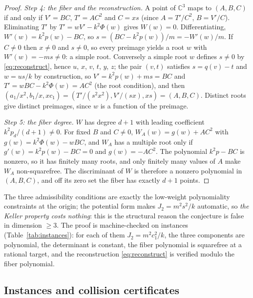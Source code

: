 \documentclass[11pt]{article}
\theoremstyle{definition}
\theoremstyle{remark}
\newcommand{\C}{\mathbb{C}}
\begin{document}
\begin{proof}
\emph{Step 4: the fiber and the reconstruction.} A point of $\C^3$ maps to $(A,B,C)$ if and only if $V' = BC$, $T' = AC^2$ and $C = xs$ (since $A = T'/C^2$, $B = V'/C$). Eliminating $T'$ by $T' = wV' - k^2\Phi(w)$ gives $W(w) = 0$. Differentiating, $W'(w) = k^2p(w) - BC$, so $s = (BC - k^2p(w))/m = -W'(w)/m$. If $C \neq 0$ then $x \neq 0$ and $s \neq 0$, so every preimage yields a root $w$ with $W'(w) = -ms \neq 0$: a simple root. Conversely a simple root $w$ defines $s \ne 0$ by \eqref{eq:reconstruct}, hence $u$, $x$, $v$, $t$, $y$, $z$; the pair $(v,t)$ satisfies $s = q(v) - t$ and $w = us/k$ by construction, so $V' = k^2p(w) + ms = BC$ and $T' = wBC - k^2\Phi(w) = AC^2$ (the root condition), and then $(a_1/x^2, b_1/x, xc_1) = (T'/(s^2x^2), V'/(sx), xs) = (A,B,C)$. Distinct roots give distinct preimages, since $w$ is a function of the preimage.

\emph{Step 5: the fiber degree.} $W$ has degree $d+1$ with leading coefficient $k^2p_d/(d+1) \neq 0$. For fixed $B$ and $C \neq 0$, $W_A(w) = g(w) + AC^2$ with $g(w) = k^2\Phi(w) - wBC$, and $W_A$ has a multiple root only if $g'(w) = k^2p(w) - BC = 0$ and $g(w) = -AC^2$. The polynomial $k^2 p - BC$ is nonzero, so it has finitely many roots, and only finitely many values of $A$ make $W_A$ non-squarefree. The discriminant of $W$ is therefore a nonzero polynomial in $(A,B,C)$, and off its zero set the fiber has exactly $d+1$ points.
\end{proof}

The three admissibility conditions are exactly the low-weight polynomiality constraints at the origin; the potential form makes $J_2 = m^2 s^2/k$ automatic, so \emph{the Keller property costs nothing}: this is the structural reason the conjecture is false in dimension $\ge 3$. The proof is machine-checked on instances (Table~\ref{tab:instances}): for each of them $J_2 = m^2c_1^2/k$, the three components are polynomial, the determinant is constant, the fiber polynomial is squarefree at a rational target, and the reconstruction \eqref{eq:reconstruct} is verified modulo the fiber polynomial.

\subsection{Instances and collision certificates}\label{sec:instances}

\begin{table}[t]\centering\small\setlength{\tabcolsep}{4pt}

\caption{Instances of the constructor, read from the stored outputs of computations EXP-004 and EXP-008: the seed $p$ of degree $d$, the scale $k$, the section tail beyond degree one, the determinant $-k\,p(1)^2$, the total degrees of the three components and the generic fiber degree $d+1$. Instance $F$ is the announced map.}
\label{tab:instances}
\end{table}
\end{document}
